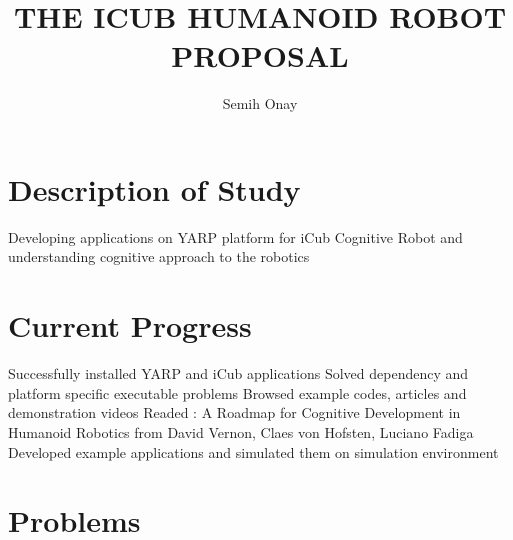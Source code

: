 \documentclass[12pt]{report}
\title{THE ICUB HUMANOID ROBOT \\ PROPOSAL}
\author{Semih Onay}
\begin{document}
\makecstitle

\chapter*{Description of Study}
Developing applications on YARP platform for iCub Cognitive Robot and understanding 
cognitive approach to the robotics

\chapter*{Current Progress}
Successfully installed YARP and iCub  applications
Solved dependency and platform specific executable problems
Browsed example codes, articles and demonstration videos
Readed  : A Roadmap for Cognitive Development in Humanoid Robotics from David Vernon, Claes von Hofsten, Luciano Fadiga
Developed example applications and simulated them on simulation environment

\chapter*{Problems}
\end{document}
